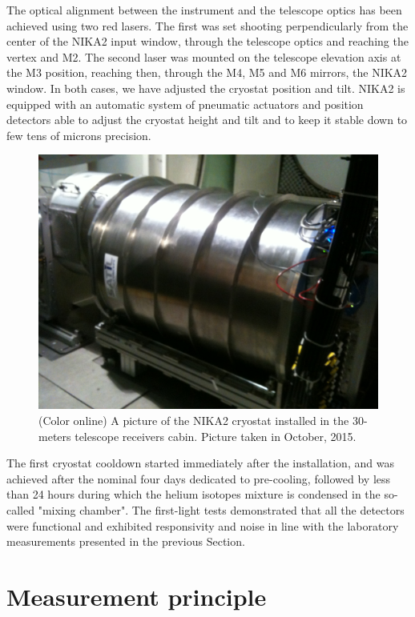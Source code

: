 \documentclass[]{aa} %
\begin{document}
The optical alignment between the instrument and the telescope optics has been achieved using two red lasers. The first was set shooting perpendicularly from the center of the NIKA2 input window, through the telescope optics and reaching the vertex and M2. The second laser was mounted on the telescope elevation axis at the M3 position, reaching then, through the M4, M5 and M6 mirrors, the NIKA2 window. In both cases, we have adjusted the cryostat position and tilt. NIKA2 is equipped with an automatic system of pneumatic actuators and position detectors able to adjust the cryostat height and tilt and to keep it stable down to few tens of microns precision. 

\begin{figure}[h]
   \centering
    \includegraphics[width=.85\linewidth]{NIKA2cryo.jpg}
      \caption{(Color online) A picture of the NIKA2 cryostat installed in the 30-meters telescope receivers cabin. Picture taken in October, 2015.}
         \label{Fig5}
\end{figure}

The first cryostat cooldown started immediately after the installation, and was achieved after the nominal four days dedicated to pre-cooling, followed by less than 24 hours during which the helium isotopes mixture is condensed in the so-called "mixing chamber". The first-light tests demonstrated that all the detectors were functional and exhibited responsivity and noise in line with the laboratory measurements presented in the previous Section. 


\section{Measurement principle}
\label{Measurement principle}
\end{document}
